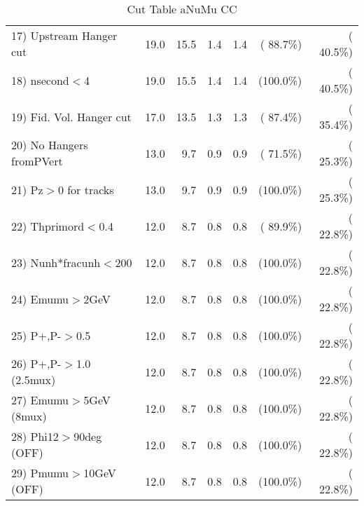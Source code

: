 \begin{table}[h!]
\begin{tabular}{||l||r|r|r|r|r|r||}
 17) Upstream Hanger cut  &         19.0 &         15.5 &          1.4 &          1.4 & ( 88.7\%) & ( 40.5\%) \\
 18) nsecond$<$4          &         19.0 &         15.5 &          1.4 &          1.4 & (100.0\%) & ( 40.5\%) \\
 19) Fid. Vol. Hanger cut &         17.0 &         13.5 &          1.3 &          1.3 & ( 87.4\%) & ( 35.4\%) \\
 20) No Hangers fromPVert &         13.0 &          9.7 &          0.9 &          0.9 & ( 71.5\%) & ( 25.3\%) \\
 21) Pz$>$0 for tracks    &         13.0 &          9.7 &          0.9 &          0.9 & (100.0\%) & ( 25.3\%) \\
 22) Thprimord$<$0.4      &         12.0 &          8.7 &          0.8 &          0.8 & ( 89.9\%) & ( 22.8\%) \\
 23) Nunh*fracunh$<$200   &         12.0 &          8.7 &          0.8 &          0.8 & (100.0\%) & ( 22.8\%) \\
 24) Emumu$>$2GeV         &         12.0 &          8.7 &          0.8 &          0.8 & (100.0\%) & ( 22.8\%) \\
 25) P+,P-$>$0.5          &         12.0 &          8.7 &          0.8 &          0.8 & (100.0\%) & ( 22.8\%) \\
 26) P+,P-$>$1.0 (2.5mux) &         12.0 &          8.7 &          0.8 &          0.8 & (100.0\%) & ( 22.8\%) \\
 27) Emumu$>$5GeV  (8mux) &         12.0 &          8.7 &          0.8 &          0.8 & (100.0\%) & ( 22.8\%) \\
 28) Phi12$>$90deg  (OFF) &         12.0 &          8.7 &          0.8 &          0.8 & (100.0\%) & ( 22.8\%) \\
 29) Pmumu$>$10GeV  (OFF) &         12.0 &          8.7 &          0.8 &          0.8 & (100.0\%) & ( 22.8\%) \\
 \hline
 \hline
 \end{tabular}
 \caption{Cut Table  aNuMu CC }
 \label{tab-cutcohjpsi-mumu_anumucc}
 \end{table}
